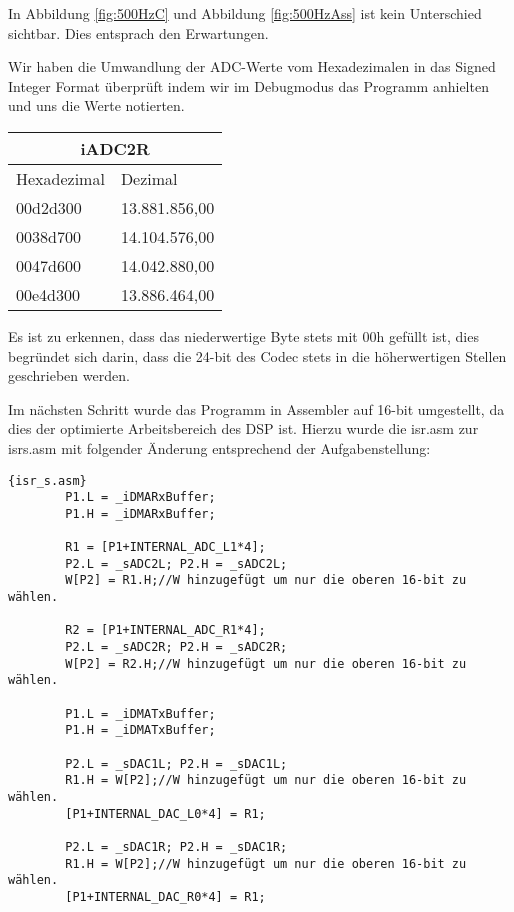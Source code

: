 In Abbildung \ref{fig:500HzC} und Abbildung \ref{fig:500HzAss} ist kein Unterschied sichtbar. Dies entsprach den 
Erwartungen.\pagebreak

Wir haben die Umwandlung der ADC-Werte vom Hexadezimalen in das Signed Integer Format überprüft indem wir im Debugmodus das Programm anhielten und uns die Werte notierten.

\begin{center}
    \begin{tabular}{ | l | l | }\hline
      \multicolumn{2}{|c|}{iADC2R}\\
    \hline
    Hexadezimal & Dezimal \\ \hline
    00d2d300 &	13.881.856,00 \\ \hline
    0038d700 &	14.104.576,00 \\ \hline
    0047d600 &	14.042.880,00 \\ \hline
    00e4d300 &	13.886.464,00 \\ 
    \hline
    \end{tabular}
\end{center}
Es ist zu erkennen, dass das niederwertige Byte stets mit 00h gefüllt ist, 
dies begründet sich darin, dass die 24-bit des Codec stets in die höherwertigen Stellen geschrieben werden.

Im nächsten Schritt wurde das Programm in Assembler auf 16-bit umgestellt, da dies der optimierte Arbeitsbereich des DSP ist.
Hierzu wurde die isr.asm zur isr\textunderscore s.asm mit folgender Änderung entsprechend der 
Aufgabenstellung:\\
 \begin{lstlisting}[title=isr\textunderscore s.asm]{isr_s.asm}
        P1.L = _iDMARxBuffer; 
        P1.H = _iDMARxBuffer;

        R1 = [P1+INTERNAL_ADC_L1*4];
        P2.L = _sADC2L; P2.H = _sADC2L;
        W[P2] = R1.H;//W hinzugefügt um nur die oberen 16-bit zu wählen.
        
        R2 = [P1+INTERNAL_ADC_R1*4];
        P2.L = _sADC2R; P2.H = _sADC2R;
        W[P2] = R2.H;//W hinzugefügt um nur die oberen 16-bit zu wählen.

        P1.L = _iDMATxBuffer; 
        P1.H = _iDMATxBuffer;

        P2.L = _sDAC1L; P2.H = _sDAC1L;
        R1.H = W[P2];//W hinzugefügt um nur die oberen 16-bit zu wählen.
        [P1+INTERNAL_DAC_L0*4] = R1;
        
        P2.L = _sDAC1R; P2.H = _sDAC1R;
        R1.H = W[P2];//W hinzugefügt um nur die oberen 16-bit zu wählen.
        [P1+INTERNAL_DAC_R0*4] = R1;
 \end{lstlisting}

